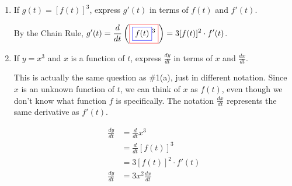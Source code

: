 \documentclass{article}
\begin{document}
\begin{enumerate}
  \begin{enumerate}
  \item
    \begin{problem}[\vfill]
      If $g(t) = [f(t)]^3$, express $g'(t)$ in terms of $f(t)$ and $f'(t)$.
    \end{problem}

    \begin{solution}
      By the Chain Rule, $\displaystyle g'(t) = \frac{d}{dt}
      \left(\fcolorbox{red}{white}{$\displaystyle
          \fcolorbox{blue}{white}{$\displaystyle f(t)$}^ { 3} $}\right) =
      3 [f(t)]^2 \cdot f'(t)$.
    \end{solution}

  \item
    \begin{problem}[\vfill]
      If $y=x^3$ and $x$ is a function of $t$, express $\frac{dy}{dt}$
      in terms of $x$ and $\frac{dx}{dt}$. 
    \end{problem}

    \begin{solution}
      This is actually the same question as
      {{{{\#1}}(a)}}, just in different notation.
      Since $x$ is an unknown function of $t$, we can think of $x$ as
      $f(t)$, even though we don't know what function $f$ is specifically. The notation $\frac{dx}{dt}$ represents the same derivative as $f'(t)$.

      \begin{align*}
          \frac{dy}{dt} &= \frac{d}{dt} x^3 \\
          &= \frac{d}{dt} [f(t)]^3 \\
          &= 3[f(t)]^2 \cdot f'(t)\\
          \frac{dy}{dt}&= 3x^2\frac{dx}{dt}
      \end{align*}
      
    \end{solution}

  \end{enumerate}

\end{enumerate}

\end{document}
